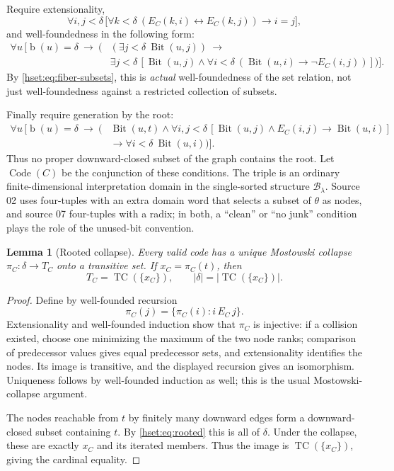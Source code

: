 \documentclass[11pt,letterpaper]{article}
\newtheorem{lemma}[lemma]{Lemma}\aliascntresetthe{lemma}
\theoremstyle{definition}
\theoremstyle{remark}
\newcommand{\bd}{\operatorname{b}}
\newcommand{\TC}{\operatorname{TC}}
\newcommand{\B}{\mathcal B}
\newcommand{\Code}{\operatorname{Code}}
\newcommand{\Bit}{\operatorname{Bit}}
\newcommand{\card}[1]{\lvert#1\rvert}
\begin{document}
Require extensionality,
\begin{equation}
 \forall i,j<\delta\,
 \bigl[\forall k<\delta\ (E_C(k,i)\leftrightarrow E_C(k,j))
       \longrightarrow i=j\bigr],
 \label{hset:eq:extensional}
\end{equation}
and well-foundedness in the following form:
\begin{align}
 \forall u\,[\bd(u)=\delta\ \longrightarrow\ (&
 (\exists j<\delta\ \Bit(u,j))\ \longrightarrow\nonumber\\[-0.2em]
 &\exists j<\delta\,[\Bit(u,j)\land
    \forall i<\delta\ (\Bit(u,i)\longrightarrow\neg E_C(i,j))])].
 \label{hset:eq:wf}
\end{align}
By \eqref{hset:eq:fiber-subsets}, this is \emph{actual} well-foundedness of the
set relation, not just well-foundedness against a restricted collection of
subsets.

Finally require generation by the root:
\begin{align}
 \forall u\,[\bd(u)=\delta\ \longrightarrow\ (&
 \Bit(u,t)\land
 \forall i,j<\delta\,[\Bit(u,j)\land E_C(i,j)\longrightarrow\Bit(u,i)]
 \nonumber\\[-0.2em]
 &\longrightarrow\forall i<\delta\ \Bit(u,i))].
 \label{hset:eq:rooted}
\end{align}
Thus no proper downward-closed subset of the graph contains the root.
Let $\Code(C)$ be the conjunction of these conditions. The triple is an
ordinary finite-dimensional interpretation domain in the single-sorted
structure $\B_\lambda$. Source 02 uses four-tuples with an extra domain word
that selects a subset of $\theta$ as nodes, and source 07 four-tuples with a
radix; in both, a ``clean'' or ``no junk'' condition plays the role of the
unused-bit convention.

\begin{lemma}[Rooted collapse]
\label{hset:lem:collapse}
Every valid code has a unique Mostowski collapse
$\pi_C:\delta\longrightarrow T_C$ onto a transitive set. If
$x_C=\pi_C(t)$, then
\[
 T_C=\TC(\{x_C\}),\qquad
 \card\delta=\card{\TC(\{x_C\})}.
\]
\end{lemma}
\begin{proof}
Define by well-founded recursion
\[
 \pi_C(j)=\{\pi_C(i):i\,E_C\,j\}.
\]
Extensionality and well-founded induction show that $\pi_C$ is injective:
if a collision existed, choose one minimizing the maximum of the two node
ranks; comparison of predecessor values gives equal predecessor sets, and
extensionality identifies the nodes. Its image is transitive, and the
displayed recursion gives an isomorphism. Uniqueness follows by well-founded
induction as well; this is the usual Mostowski-collapse argument.

The nodes reachable from $t$ by finitely many downward edges form a
downward-closed subset containing $t$. By \eqref{hset:eq:rooted} this is all of
$\delta$. Under the collapse, these are exactly $x_C$ and its iterated
members. Thus the image is $\TC(\{x_C\})$, giving the cardinal equality.
\end{proof}
\end{document}

